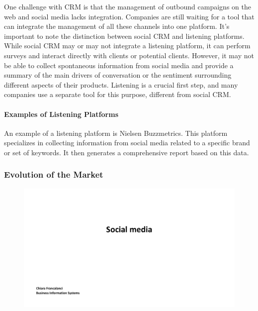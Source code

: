 One challenge with CRM is that the management of outbound campaigns on
the web and social media lacks integration. Companies are still waiting
for a tool that can integrate the management of all these channels into
one platform. It's important to note the distinction between social CRM
and listening platforms. While social CRM may or may not integrate a
listening platform, it can perform surveys and interact directly with
clients or potential clients. However, it may not be able to collect
spontaneous information from social media and provide a summary of the
main drivers of conversation or the sentiment surrounding different
aspects of their products. Listening is a crucial first step, and many
companies use a separate tool for this purpose, different from social
CRM.

\paragraph{Examples of Listening
  Platforms}\label{examples-of-listening-platforms}

An example of a listening platform is Nielsen
Buzzmetrics. This platform specializes in collecting information from
social media related to a specific brand or set of keywords. It then
generates a comprehensive report based on this data.

\subsubsection{Evolution of the Market}\label{evolution-of-the-market}

\begin{figure}[!h]
  \centering
  \includegraphics[page=28, trim = 1.5cm 1.5cm 2.5cm 3.5cm, clip, width=\imagewidth]{images/04 - Social_Media.pdf}
\end{figure}


